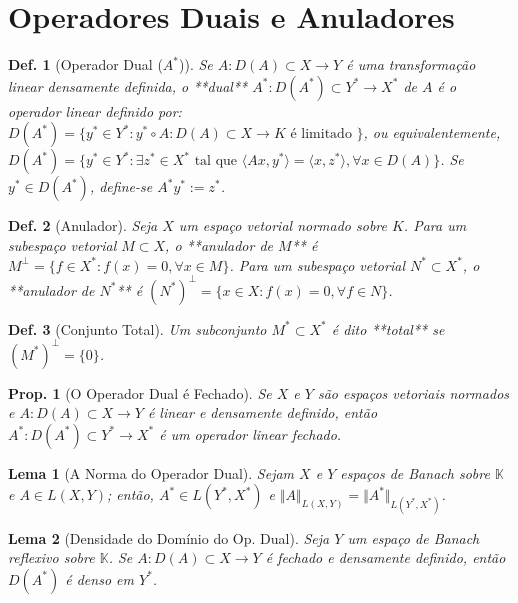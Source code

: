 \documentclass[11pt]{article}
\theoremstyle{yellowhead}
\newtheorem*{lemma}{Lema}
\newtheorem*{proposition}{Prop.}
\theoremstyle{yellowdef}
\newtheorem*{definition}{Def.}
\begin{document}
\section{Operadores Duais e Anuladores}
\begin{multicols}{3}
\begin{definition}[Operador Dual ($A^*$)]
Se $A : D(A) \subset X \rightarrow Y$ é uma transformação linear densamente definida, o **dual** $A^* : D(A^*) \subset Y^* \rightarrow X^*$ de $A$ é o operador linear definido por: $D(A^*) = \{y^* \in Y^* : y^* \circ A : D(A) \subset X \rightarrow K \text{ é limitado }\}$, ou equivalentemente, $D(A^*) = \{y^* \in Y^*:\exists z^* \in X^* \text{ tal que } \langle Ax , y^*\rangle=\langle x , z^*\rangle, \forall x \in D(A)\}$. Se $y^* \in D(A^*)$, define-se $A^*y^* := z^*$.
\end{definition}

\begin{definition}[Anulador]
Seja $X$ um espaço vetorial normado sobre $K$. Para um subespaço vetorial $M \subset X$, o **anulador de $M$** é $M^{\perp} = \{f \in X^* : f(x) = 0, \forall x \in M\}$. Para um subespaço vetorial $N^* \subset X^*$, o **anulador de $N^*$** é $(N^*)^{\perp} = \{x \in X : f(x) = 0, \forall f \in N\}$.
\end{definition}

\begin{definition}[Conjunto Total]
Um subconjunto $M^* \subset X^*$ é dito **total** se $(M^*)^{\perp} = \{0\}$.
\end{definition}
\begin{proposition}[O Operador Dual é Fechado]
Se $X$ e $Y$ são espaços vetoriais normados e $A: D(A) \subset X \to Y$ é linear e densamente definido, então $A^*: D(A^*) \subset Y^* \to X^*$ é um operador linear fechado.
\end{proposition}

\begin{lemma}[A Norma do Operador Dual]
Sejam $X$ e $Y$ espaços de Banach sobre $\mathbb{K}$ e $A \in L(X, Y)$; então, $A^* \in L(Y^*, X^*)$ e $\Vert A \Vert_{L(X, Y)} = \Vert A^* \Vert_{L(Y^*, X^*)}$.
\end{lemma}

\begin{lemma}[Densidade do Domínio do Op. Dual]
Seja $Y$ um espaço de Banach reflexivo sobre $\mathbb{K}$. Se $A: D(A) \subset X \to Y$ é fechado e densamente definido, então $D(A^*)$ é denso em $Y^*$.
\end{lemma}


\end{multicols}
\end{document}
